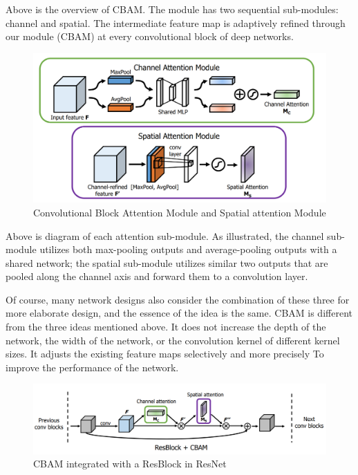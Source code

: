 Above is the overview of CBAM. The module has two sequential sub-modules:
channel and spatial. The intermediate feature map is adaptively refined through
our module (CBAM) at every convolutional block of deep networks.

\begin{figure}[H]
  \centering
  \includegraphics[width=\linewidth]{figs/cansam.png}
  \caption{Convolutional Block Attention Module and Spatial attention Module}
  \label{fig:example}
\end{figure}

Above is diagram of each attention sub-module. As illustrated, the channel
sub-module utilizes both max-pooling outputs and average-pooling outputs with
a shared network; the spatial sub-module utilizes similar two outputs that are
pooled along the channel axis and forward them to a convolution layer.

Of course, many network designs also consider the combination of these three for more elaborate design, and the essence of the idea is the same. CBAM is different from the three ideas mentioned above. It does not increase the depth of the network, the width of the network, or the convolution kernel of different kernel sizes. It adjusts the existing feature maps selectively and more precisely To improve the performance of the network.


\begin{figure}[H]
  \centering
  \includegraphics[width=\linewidth]{figs/cares.png}
  \caption{CBAM integrated with a ResBlock in ResNet}
  \label{fig:example}
\end{figure}

